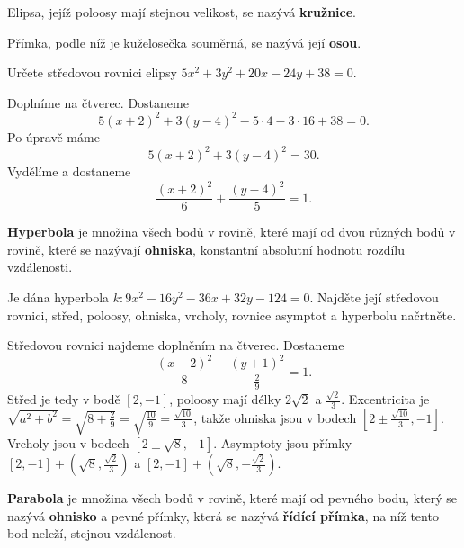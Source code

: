 \begin{definition}
    Elipsa, jejíž poloosy mají stejnou velikost, se nazývá \textbf{kružnice}.
\end{definition}

\begin{definition}
    Přímka, podle níž je kuželosečka souměrná, se nazývá její \textbf{osou}.
\end{definition}

\begin{priklad}
Určete středovou rovnici elipsy $5x^2+3y^2+20x-24y+38=0.$
\end{priklad}

\begin{reseni}
Doplníme na čtverec. Dostaneme
$$
    5(x+2)^2 + 3(y - 4)^2-5\cdot 4 - 3 \cdot 16 + 38 = 0.
$$
Po úpravě máme
$$
    5(x+2)^2 + 3(y - 4)^2 = 30.
$$
Vydělíme a dostaneme
$$
\frac{(x+2)^2}{6}+ \frac{(y-4)^2}{5} = 1.
$$
\end{reseni}

\begin{definition}
\textbf{Hyperbola} je množina všech bodů v rovině, které mají od dvou různých
bodů v rovině, které se nazývají \textbf{ohniska}, konstantní absolutní
hodnotu rozdílu vzdálenosti.
\end{definition}

\begin{priklad}
Je dána hyperbola $k\colon 9x^2-16y^2-36x+32y-124=0.$ Najděte její středovou rovnici,
střed, poloosy, ohniska, vrcholy, rovnice asymptot a hyperbolu načrtněte.
\end{priklad}

\begin{reseni}
Středovou rovnici najdeme doplněním na čtverec. Dostaneme
$$
\frac{(x-2)^2}{8} - \frac{(y+1)^2}{\frac{2}{9}} = 1.
$$
Střed je tedy v bodě $[2,-1]$, poloosy mají délky $2 \sqrt{2}$ a $\frac{\sqrt{2}}{3}$. Excentricita je
$\sqrt{a^2 + b^2} = \sqrt{8 + \frac{2}{9}} = \sqrt{\frac{10}{9}} = \frac{\sqrt{10}}{3}$, takže
ohniska jsou v bodech $[2\pm \frac{\sqrt{10}}{3}, -1]$. Vrcholy jsou v bodech $[2 \pm \sqrt{8}, -1]$.
Asymptoty jsou přímky $[2, -1] + (\sqrt{8}, \frac{\sqrt{2}}{3})$ a $[2, -1] + (\sqrt{8}, -\frac{\sqrt{2}}{3})$.
\end{reseni}

\begin{definition}
\textbf{Parabola} je množina všech bodů v rovině, které mají od pevného bodu, který
se nazývá \textbf{ohnisko} a pevné přímky, která se nazývá \textbf{řídící přímka},
na níž tento bod neleží, stejnou vzdálenost.
\end{definition}

